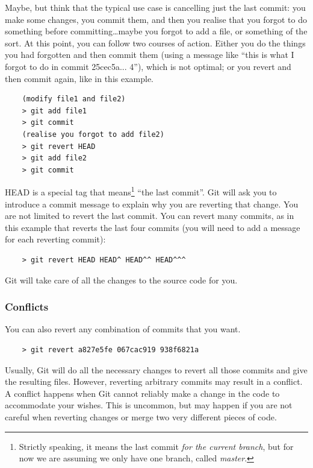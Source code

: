 Maybe, but think that the typical use case is cancelling just the last
commit: you make some changes, you commit them, and then you realise
that you forgot to do something before committing\ldots maybe you
forgot to add a file, or something of the sort. At this point, you can
follow two courses of action. Either you do the things you had
forgotten and then commit them (using a message like ``this is what I
forgot to do in commit 25cec5a... 4''), which is not optimal; or you
revert and then commit again, like in this example.

\begin{verbatim}
    (modify file1 and file2)
    > git add file1
    > git commit 
    (realise you forgot to add file2)
    > git revert HEAD
    > git add file2
    > git commit
\end{verbatim}

HEAD is a special tag that means\footnote{Strictly speaking, it means
  the last commit \emph{for the current branch}, but for now we are
  assuming we only have one branch, called \emph{master}.} ``the last
commit''. Git will ask you 
to introduce a commit message to explain why you are reverting that
change. You are not limited to revert the last commit. You can revert
many commits, as in this example that reverts the last four commits
(you will need to add a message for each reverting commit): 

\begin{verbatim}
    > git revert HEAD HEAD^ HEAD^^ HEAD^^^
\end{verbatim}

Git will take care of all the changes to the source code for you. 

\subsubsection{Conflicts}
\label{sec:conflicts}

You can also revert any combination of commits that you want. 

\begin{verbatim}
    > git revert a827e5fe 067cac919 938f6821a
\end{verbatim}

Usually, Git will do all the necessary changes to revert all those
commits and give the resulting files. 
However, reverting arbitrary commits
 may result in a conflict. A conflict happens when Git
cannot reliably make a change in the code to accommodate your
wishes. This is uncommon, but may happen if you are not careful when
reverting changes or merge two very different pieces of code. 

